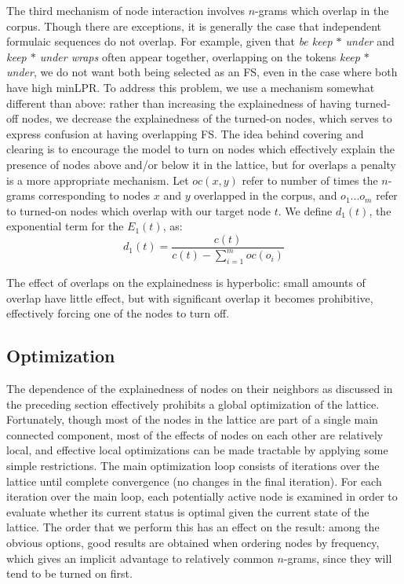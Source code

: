 \documentclass[11pt,letterpaper]{article}
\newcommand{\dotts}{...}
\newcommand{\gap}{$*$\xspace}
\newcommand{\ex}[1]{\textit{#1}\xspace}
\begin{document}
The third mechanism of node interaction involves $n$-grams which overlap in the corpus. Though there are exceptions, it is generally the case that independent formulaic sequences do not overlap. For example, given that \ex{be keep \gap under} and \ex{keep \gap under wraps} often appear together, overlapping on the tokens \ex{keep \gap under}, we do not want both being selected as an FS, even in the case where both have high minLPR. To address this problem, we use a mechanism somewhat different than above: rather than increasing the explainedness of having turned-off nodes, we decrease the explainedness of the turned-on nodes, which serves to express confusion at having overlapping FS. The idea behind covering and clearing is to encourage the model to turn on nodes which effectively explain the presence of nodes above and/or below it in the lattice, but for overlaps a penalty is a more appropriate mechanism. Let $oc(x,y)$ refer to number of times the $n$-grams corresponding to nodes $x$ and $y$ overlapped in the corpus, and $o_1\dotts o_m$ refer to turned-on nodes which overlap with our target node $t$. We define $d_1(t)$, the exponential term for the $E_1(t)$, as:
\begin{displaymath}
d_{1}(t) = \frac{c(t)}{c(t) - \sum_{i=1}^{m}{oc(o_i)}}
\end{displaymath}

The effect of overlaps on the explainedness is hyperbolic: small amounts of overlap have little effect, but with significant overlap it becomes prohibitive, effectively forcing one of the nodes to turn off. 

 
\subsection{Optimization}

The dependence of the explainedness of nodes on their neighbors as discussed in the preceding section effectively prohibits a global optimization of the lattice. Fortunately, though most of the nodes in the lattice are part of a single main connected component, most of the effects of nodes on each other are relatively local, and effective local optimizations can be made tractable by applying some simple restrictions. The main optimization loop consists of iterations over the lattice until complete convergence (no changes in the final iteration). For each iteration over the main loop, each potentially active node is examined in order to evaluate whether its current status is optimal given the current state of the lattice. The order that we perform this has an effect on the result: among the obvious options, good results are obtained when ordering nodes by frequency, which gives an implicit advantage to relatively common $n$-grams, since they will tend to be turned on first.
\end{document}

